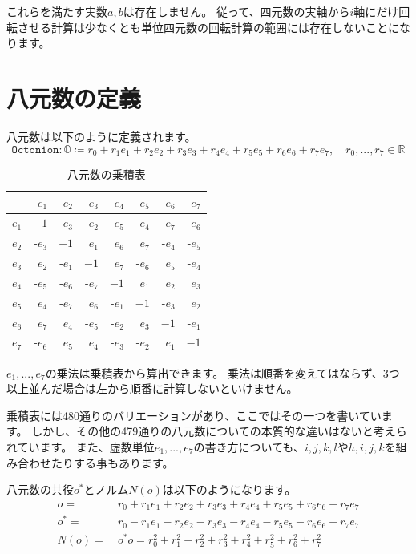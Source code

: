 \documentclass[a4paper,12pt,notitlepage]{jsreport}
\begin{document}
これらを満たす実数$a,b$は存在しません。
従って、四元数の実軸から$i$軸にだけ回転させる計算は少なくとも単位四元数の回転計算の範囲には存在しないことになります。

\section{八元数の定義}

八元数は以下のように定義されます。
\begin{equation}
  \texttt{Octonion}:\mathbb{O}\coloneq r_0+r_1e_1+r_2e_2+r_3e_3+r_4e_4+r_5e_5+r_6e_6+r_7e_7,
  \quad r_0,...,r_7\in\mathbb{R}
\end{equation}

\begin{table}
  \caption{八元数の乗積表}
  \centering
  \begin{tabular}{rrrrrrrr}\hline
        & $e_1$& $e_2$& $e_3$& $e_4$& $e_5$& $e_6$& $e_7$\\\hline
    $e_1$& $ -1$& $e_3$&-$e_2$& $e_5$&-$e_4$&-$e_7$& $e_6$\\\hline
    $e_2$&-$e_3$& $ -1$& $e_1$& $e_6$& $e_7$&-$e_4$&-$e_5$\\\hline
    $e_3$& $e_2$&-$e_1$& $ -1$& $e_7$&-$e_6$& $e_5$&-$e_4$\\\hline
    $e_4$&-$e_5$&-$e_6$&-$e_7$& $ -1$& $e_1$& $e_2$& $e_3$\\\hline
    $e_5$& $e_4$&-$e_7$& $e_6$&-$e_1$& $ -1$&-$e_3$& $e_2$\\\hline
    $e_6$& $e_7$& $e_4$&-$e_5$&-$e_2$& $e_3$& $ -1$&-$e_1$\\\hline
    $e_7$&-$e_6$& $e_5$& $e_4$&-$e_3$&-$e_2$& $e_1$& $ -1$\\\hline
  \end{tabular}
\end{table}

$e_1,...,e_7$の乗法は乗積表から算出できます。
乗法は順番を変えてはならず、3つ以上並んだ場合は左から順番に計算しないといけません。

乗積表には480通りのバリエーションがあり、ここではその一つを書いています。
しかし、その他の479通りの八元数についての本質的な違いはないと考えられています。
また、虚数単位$e_1,...,e_7$の書き方についても、$i,j,k,l$や$h,i,j,k$を組み合わせたりする事もあります。

八元数の共役$o^*$とノルム$N(o)$は以下のようになります。
\begin{equation}
  \begin{split}
    o=~&r_0+r_1e_1+r_2e_2+r_3e_3+r_4e_4+r_5e_5+r_6e_6+r_7e_7\\
    o^*=~&r_0-r_1e_1-r_2e_2-r_3e_3-r_4e_4-r_5e_5-r_6e_6-r_7e_7\\
    N(o)=~&o^*o=r_0^2+r_1^2+r_2^2+r_3^2+r_4^2+r_5^2+r_6^2+r_7^2
  \end{split}
\end{equation}
\end{document}
